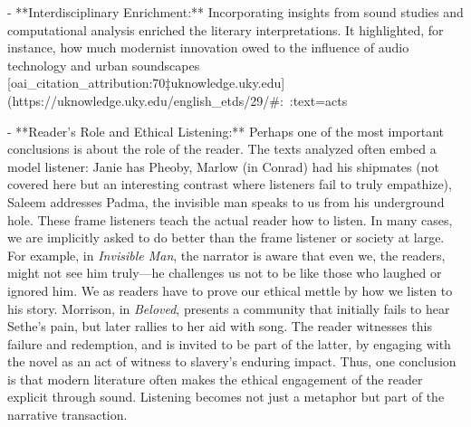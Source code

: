 \documentclass[12pt]{report}
\begin{document}
- **Interdisciplinary Enrichment:** Incorporating insights from sound studies and computational analysis enriched the literary interpretations. It highlighted, for instance, how much modernist innovation owed to the influence of audio technology and urban soundscapes [oai_citation_attribution:70‡uknowledge.uky.edu](https://uknowledge.uky.edu/english_etds/29/#:~:text=acts%

- **Reader’s Role and Ethical Listening:** Perhaps one of the most important conclusions is about the role of the reader. The texts analyzed often embed a model listener: Janie has Pheoby, Marlow (in Conrad) had his shipmates (not covered here but an interesting contrast where listeners fail to truly empathize), Saleem addresses Padma, the invisible man speaks to us from his underground hole. These frame listeners teach the actual reader how to listen. In many cases, we are implicitly asked to do better than the frame listener or society at large. For example, in \textit{Invisible Man}, the narrator is aware that even we, the readers, might not see him truly—he challenges us not to be like those who laughed or ignored him. We as readers have to prove our ethical mettle by how we listen to his story. Morrison, in \textit{Beloved}, presents a community that initially fails to hear Sethe’s pain, but later rallies to her aid with song. The reader witnesses this failure and redemption, and is invited to be part of the latter, by engaging with the novel as an act of witness to slavery’s enduring impact. Thus, one conclusion is that modern literature often makes the ethical engagement of the reader explicit through sound. Listening becomes not just a metaphor but part of the narrative transaction. 
\end{document}
